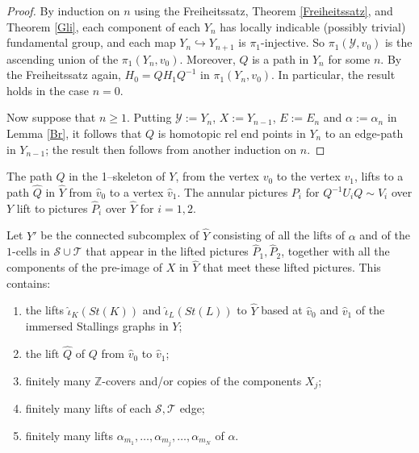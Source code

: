 \documentclass[12pt,a4paper]{amsart}
\def\Z{\mathbb{Z}}
\def\wh{\widehat}
\def\a{\alpha}
\def\cS{\mathcal{S}}
\def\cT{\mathcal{T}}
\begin{document}
\begin{proof}
	By induction on $n$ using the Freiheitssatz, Theorem \ref{Freiheitssatz}, 
	and Theorem \ref{Gli}, each component of each $Y_n$ has locally indicable  (possibly trivial) fundamental group, 
	and each map $Y_n\hookrightarrow Y_{n+1}$ is $\pi_1$-injective.  
	So $\pi_1(\mathcal Y,v_0)$ is the ascending union of the $\pi_1(Y_n,v_0)$.  
	Moreover, $Q$ is a path in $Y_n$ for some $n$.  
	By the Freiheitssatz again, $H_0=Q H_1 Q^{-1}$ in $\pi_1(Y_n,v_0)$.  In particular, the result holds in the case $n=0$.
	

	Now suppose that $n\ge1$. Putting $\mathcal Y:=Y_n$, $X:=Y_{n-1}$, $E:=E_n$ and $\a:=\a_n$ in Lemma \ref{Br}, it follows that $Q$ is homotopic rel end points in $Y_n$ to an edge-path in $Y_{n-1}$; the result then follows from another induction on $n$. 
\end{proof}
 


The path $Q$ in the 1--skeleton of $Y$, from the vertex $v_0$
to the vertex $v_1$,  lifts to a path $\wh Q$ in $\wh Y$ from $\wh v_0$ to a vertex $\wh v_1$. 
The  annular pictures $P_i$ for $Q^{-1}U_iQ\sim V_i$  over $Y$ lift to
pictures $\wh{P}_i$ over $\wh{Y}$ for $i=1,2$.


Let $Y'$ be the connected subcomplex of $\wh Y$ 
consisting of all the lifts of $\a$ and of the $1$-cells in $\cS\cup\cT$ that appear in the lifted pictures  
$\wh P_1,\wh P_2$, together with all the components of the pre-image of $X$ in $\wh{Y}$ that meet these  lifted pictures.
This contains:
\begin{enumerate}  
	
	\item[$\bullet$] the lifts $\wh\iota_K(St(K))$  and  $\wh\iota_L(St(L))$ 
	 to $\wh Y$ based at $\wh v_0$ and $\wh v_1$ of the immersed Stallings graphs in $Y$;
	
	\item[$\bullet$] the lift $\wh Q$ of $Q$ from  $\wh v_0$ to $\wh v_1$;
	
	
	\item[$\bullet$] finitely many $\Z$-covers and/or copies of the components $X_j$;
	
	\item[$\bullet$] finitely many lifts of each $\cS,\cT$ edge;
	
	\item[$\bullet$] finitely many lifts $\alpha_{m_1} , \dots ,\alpha_{m_j}, \dots,\alpha_{m_N}$ of $\alpha$.
	
\end{enumerate}
\end{document}
